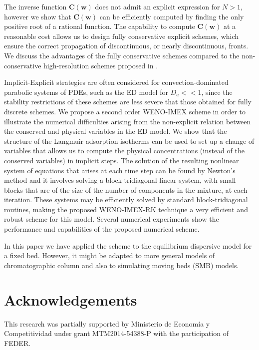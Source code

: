\documentclass[preprint]{elsarticle}
\theoremstyle{definition}
\newcommand{\bw}{\boldsymbol w}
\newcommand{\bC}{\boldsymbol C}
\begin{document}
The inverse function $\bC(\bw)$ does not admit an explicit expression
for $N>1$, however we show that $\bC(\bw)$ can be efficiently computed
by finding the only  
positive root of a  rational function.
The capability to compute $\bC(\bw)$ at a reasonable cost allows us to
design fully conservative explicit schemes, which ensure the correct
propagation of discontinuous, or nearly discontinuous, fronts. We
discuss the advantages of the fully conservative schemes compared to the
non-conservative  high-resolution
schemes proposed in \cite{Javeed}.

Implicit-Explicit strategies are often considered  for
convection-dominated parabolic systems of PDEs, such as the ED model
for $D_a<<1$, since  the stability restrictions of these schemes are
less severe that those obtained for fully discrete schemes. We propose
 a second  order WENO-IMEX 
scheme in order to illustrate the numerical difficulties arising from the
non-explicit relation between the conserved and physical variables in
the ED model. We show that the structure of the Langmuir adsorption isotherms
can be used to set up a change of variables that allows us to compute
the physical concentrations (instead of the 
conserved variables) in implicit steps. The solution of the
resulting nonlinear system  of equations that arises at each time step
 can be found by Newton's method and it involves solving a
block-tridiagonal linear system, with small blocks that are of the size of the
number of components in the mixture, at each iteration. These systems
may be efficiently 
solved by standard block-tridiagonal routines, making the proposed
WENO-IMEX-RK technique a very efficient and robust scheme for this
model. Several numerical experiments show the performance and capabilities of
the proposed numerical scheme. 

 In this paper we have applied the scheme to the equilibrium dispersive model for a fixed bed. However,  it might be adapted to more general models of chromatographic column and also to simulating moving beds (SMB) models. 






 
\section*{Acknowledgements}
This research was partially supported by Ministerio de Econom\'ia y Competitividad under grant  MTM2014-54388-P with the participation of FEDER.
\end{document}
